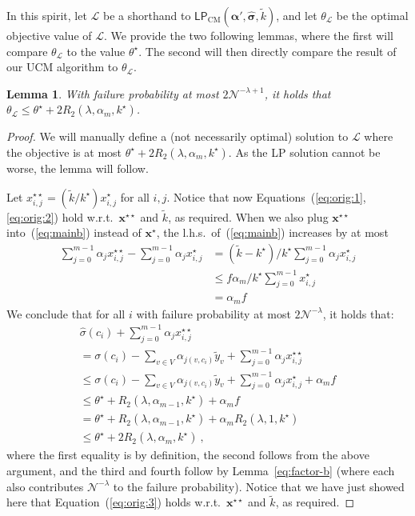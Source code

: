 \documentclass[letterpaper]{article} %
\newtheorem{lemma}[theorem]{Lemma}
\theoremstyle{definition}
\newcommand{\NN}{\mathcal{N}}
\newcommand{\LL}{\mathcal{L}}
\newcommand\vecc{\mathbf}
\newcommand\vecgreek{\bm}
\newcommand{\veca}{\vecgreek{\alpha}}
\newcommand{\LPCM}{\mathsf{LP}_{\mathrm{CM}}}
\begin{document}
In this spirit, let $\LL$ be a shorthand to $\LPCM(\veca', \vecgreek{\hat{\sigma}}, \tilde{k})$, and let $\theta_{\LL}$ be the optimal objective value of $\LL$. We provide the two following lemmas, where the first will compare  $\theta_{\LL}$ to the value $\theta^\star$. The second will then directly compare the result of our UCM algorithm to $\theta_{\LL}$.
\begin{lemma}\label{lem:double_star}
	With failure probability at most $2\NN^{-\lambda+1}$, it holds that $\theta_{\LL}\leq \theta^\star  +  2R_2(\lambda, \alpha_{m},k^\star)$.
\end{lemma}
\begin{proof}
	We will manually define a (not necessarily optimal) solution to $\LL$ where the objective is at most $\theta^\star  + 2R_2(\lambda, \alpha_{m},k^\star)$. As the LP solution cannot be worse, the lemma will follow.
	
	Let $x^{\star \star }_{i,j} = (\tilde{k}/k^\star )x^{\star }_{i,j}$ for all $i,j$. Notice that now Equations~(\ref{eq:orig:1},\ref{eq:orig:2}) hold w.r.t.\ $\vecc{x^{\star \star }}$ and $\tilde{k}$, as required. When we also  plug $\vecc{x^{\star \star }}$ into~(\ref{eq:mainb}) instead of $\vecc{x^{\star}}$, the l.h.s.\ of~(\ref{eq:mainb}) increases by at most  
	\begin{align*}
		\sum_{j=0}^{m-1} \alpha_j x^{\star \star }_{i,j}-\sum_{j=0}^{m-1} \alpha_j  x^\star _{i,j} &= (\tilde{k}-k^\star )/k^\star   \sum_{j=0}^{m-1} \alpha_j  x^\star _{i,j}\\
		&\leq f\alpha_m /k^\star  \sum_{j=0}^{m-1} x^\star _{i,j}\\
		&=  \alpha_m f
	\end{align*}
	We conclude that for all $i$ with failure probability at most $2\NN^{-\lambda}$, it holds that:
	\begin{multline*}
	\hat{\sigma}(c_i)  + \sum_{j=0}^{m-1} \alpha_j x^{\star \star }_{i,j}\\
	= \sigma(c_i) - \sum_{v \in V}\alpha_{j(v,c_i)} \tilde{y}_{v} + \sum_{j=0}^{m-1}\alpha_j x^{\star \star }_{i,j} \\ 
	\leq \sigma(c_i) - \sum_{v \in V}\alpha_{j(v,c_i)} \tilde{y}_{v} + \sum_{j=0}^{m-1}\alpha_j x^{\star }_{i,j} + \alpha_m f\\
	\leq \theta^\star  +  R_2(\lambda, \alpha_{m-1},k^\star)+\alpha_m f \\
	=\theta^\star  +  R_2(\lambda, \alpha_{m-1},k^\star)+\alpha_m R_2(\lambda, 1,k^\star)\\
	\leq \theta^\star  +  2R_2(\lambda, \alpha_{m},k^\star)\ ,
	\end{multline*}
	where the first equality is by definition, the second follows from the above argument, and the third and fourth follow by Lemma~\ref{eq:factor-b} (where each also contributes $\NN^{-\lambda}$ to the failure probability). Notice that we have just showed here that Equation~(\ref{eq:orig:3}) holds w.r.t.\ $\vecc{x^{\star \star }}$ and $\tilde{k}$, as required.
	

\end{proof}
\end{document}
